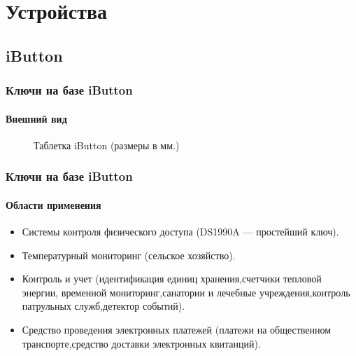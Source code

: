 \section{Устройства}


\subsection{iButton}


\begin{frame}
    \frametitle{Ключи на базе iButton}
    \framesubtitle{Внешний вид}
    
    \begin{figure}
        \begin{center}
            \caption{Таблетка iButton (размеры в мм.)}\label{pict:ibutton}
        \end{center}
    \end{figure} 
    
\end{frame}


\begin{frame}
    \frametitle{Ключи на базе iButton}
    \framesubtitle{Области применения}

    \begin{itemize}
        \item Системы контроля физического доступа (DS1990A --- простейший ключ).
        \item Температурный мониторинг (сельское хозяйство).
        \item Контроль и учет (идентификация единиц хранения,счетчики тепловой энергии,
            временной мониторинг,санатории и лечебные учреждения,контроль патрульных служб,детектор событий).
        \item Средство проведения электронных платежей (платежи на общественном транспорте,средство 
            доставки электронных квитанций).
    \end{itemize}
\end{frame}


